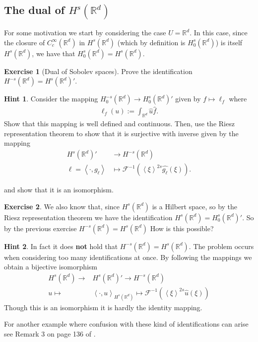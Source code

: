 \documentclass[
    a4paper,
    DIV=14,
    abstract=true,
    numbers=noenddot
]
{scrartcl}
\theoremstyle{definition}
\newtheorem{exercise}{Exercise}
\newtheorem*{hint}{Hint}
\newcommand{\wh}[1]{\widehat{#1}}
\newcommand{\br}[1]{\left\langle#1\right\rangle}
\newcommand{\R}{\mathbb{R}}
\begin{document}
\subsection{The dual of $H^s(\R^d)$}
For some motivation we start by considering the case $U=\R^d$. In this case, since the closure of
$C_c^\infty(\R^d)$ in $H^s(\R^d)$ (which by definition is $H_0^s(\R^d)$) is itself $H^s(\R^d)$, we have that $H_0^s(\R^d)=H^s(\R^d)$.
\begin{exercise}[Dual of Sobolev spaces]\label{dual exercise}
	Prove the identification $H^{-s}(\R^d)=H^s(\R^d)'$.
\end{exercise}
\begin{hint}

	Consider the mapping  $H_0^{-s}(\R^d) \to H^s_0(\R^d)'$ given by $f \mapsto \ell_f$ where
	\begin{align*}
		\ell_f(u):= \int_{\R^d}\wh{u} \wh{f} .
	\end{align*}
	Show that this mapping is well defined and continuous. Then, use the Riesz representation theorem to show that it is surjective with inverse given by the mapping
	\begin{align*}
		H^s(\R^d)'                & \longrightarrow H^{-s}(\R^d)                                 \\
		\ell = \br{\cdot, g_\ell} & \longmapsto \mathcal{F}^{-1}(\br{\xi}^{2s}\wh{g_\ell}(\xi ))
		.\end{align*}


	and show that it is an isomorphism.
\end{hint}
\begin{exercise}
	We also know that, since $H^s(\R^d)$ is a Hilbert space, so by the Riesz representation theorem we have the identification $H^s(\R^d) = H^{s}_0(\R^d)'$. So by the previous exercise $H^{-s}(\R^d)= H^s(\R^d)$ How is this possible?
\end{exercise}
\begin{hint}
	In fact it does \textbf{not} hold that $H^{-s}(\R^d)= H^s(\R^d)$. The problem occurs when considering too many identifications at once. By following the mappings we obtain a bijective isomorphism
	\begin{align*}
		H^{s}(\R^d) \to & H^s(\R^d)' \to H^{-s}(\R^d)                                                              \\
		u \longmapsto   & \br{\cdot, u}_{H^s(\R^d)} \mapsto \mathcal{F}^{-1}\left(\br{\xi}^{2s}\wh{u}(\xi )\right)
	\end{align*}
	Though this is an isomorphism it is hardly the identity mapping.
\end{hint}
For another example where confusion with these kind of identifications can arise see Remark 3 on page  136 of \cite{brezis2011functional}.
\end{document}
